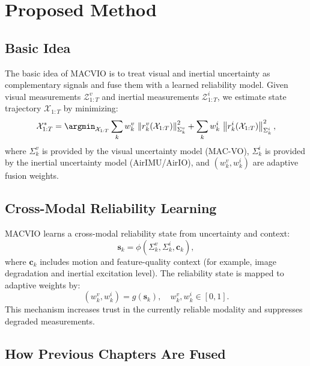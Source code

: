 \section{Proposed Method}
\label{sec:macvio:method}

\subsection{Basic Idea}

The basic idea of MACVIO is to treat visual and inertial uncertainty as complementary signals and fuse them with a learned reliability model.
Given visual measurements $\mathcal{Z}_{1:T}^{v}$ and inertial measurements $\mathcal{Z}_{1:T}^{i}$, we estimate state trajectory $\mathcal{X}_{1:T}$ by minimizing:
\begin{equation}
\label{eq:macvio:objective}
\mathcal{X}_{1:T}^{*}
=
\argmin_{\mathcal{X}_{1:T}}
\sum_{k} w_k^{v}\, \left\| r_k^{v}(\mathcal{X}_{1:T}) \right\|_{{\Sigma}_k^{v}}^2
+
\sum_{k} w_k^{i}\, \left\| r_k^{i}(\mathcal{X}_{1:T}) \right\|_{{\Sigma}_k^{i}}^2 ,
\end{equation}
where ${\Sigma}_k^{v}$ is provided by the visual uncertainty model (MAC-VO), ${\Sigma}_k^{i}$ is provided by the inertial uncertainty model (AirIMU/AirIO), and $(w_k^{v}, w_k^{i})$ are adaptive fusion weights.

\subsection{Cross-Modal Reliability Learning}

MACVIO learns a cross-modal reliability state from uncertainty and context:
\begin{equation}
\label{eq:macvio:state}
\mathbf{s}_k = \phi\!\left({\Sigma}_k^{v}, {\Sigma}_k^{i}, \mathbf{c}_k\right),
\end{equation}
where $\mathbf{c}_k$ includes motion and feature-quality context (for example, image degradation and inertial excitation level).
The reliability state is mapped to adaptive weights by:
\begin{equation}
\label{eq:macvio:weights}
\left(w_k^{v}, w_k^{i}\right) = g(\mathbf{s}_k), \quad w_k^{v}, w_k^{i}\in[0,1].
\end{equation}
This mechanism increases trust in the currently reliable modality and suppresses degraded measurements.

\subsection{How Previous Chapters Are Fused}

